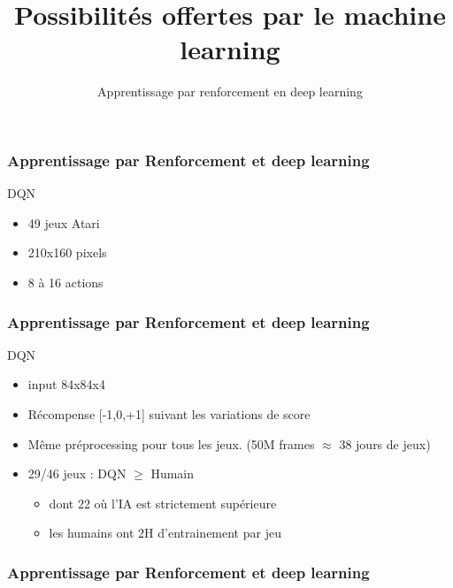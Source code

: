 \documentclass{formation}
\title{Possibilités offertes par le machine learning}
\subtitle{Apprentissage par renforcement en deep learning}
\begin{document}
\maketitle

\begin{frame}
  \frametitle{Apprentissage par Renforcement et deep learning}
  DQN
  \begin{itemize}
  \item 49 jeux Atari
  \item 210x160 pixels
  \item 8 à 16 actions
  \end{itemize}
\end{frame}

\begin{frame}
  \frametitle{Apprentissage par Renforcement et deep learning}
  DQN
  \begin{itemize}
  \item input 84x84x4
  \item Récompense [-1,0,+1] suivant les variations de score
  \item Même préprocessing pour tous les jeux. (50M frames $\approx$ 38 jours de jeux)
  \item 29/46 jeux : DQN $\geq$ Humain
    \begin{itemize}
    \item dont 22 où l'IA est strictement supérieure
    \item les humains ont 2H d'entrainement par jeu
    \end{itemize}
  \end{itemize}
\end{frame}

\begin{frame}
  \frametitle{Apprentissage par Renforcement et deep learning}
  \href{https://www.youtube.com/watch?v=lcVg9hVya-c}{}
\end{frame}
\end{document}
